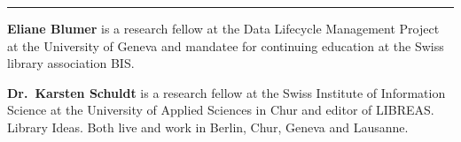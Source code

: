 \begin{center}\rule{0.5\linewidth}{\linethickness}\end{center}

\textbf{Eliane Blumer} is a research fellow at the Data Lifecycle
Management Project at the University of Geneva and mandatee for
continuing education at the Swiss library association BIS.

\textbf{Dr.~Karsten Schuldt} is a research fellow at the Swiss Institute
of Information Science at the University of Applied Sciences in Chur and
editor of LIBREAS. Library Ideas. Both live and work in Berlin, Chur,
Geneva and Lausanne.
